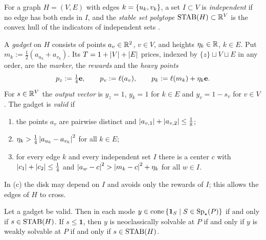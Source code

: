 For a graph $H=(V,E)$ with edges $k=\left\{ u_k,v_k \right\}$, a set $I\subset V$ is \emph{independent} if no edge has both ends in $I$, and the \emph{stable set polytope} $\operatorname{STAB}(H)\subset\mathbb{R}^V$ is the convex hull of the indicators of independent sets \citep[Ch.~9]{GrotschelLovaszSchrijver1988}.

\begin{definition}[gadget]\label{def:gadget}
A \emph{gadget} on $H$ consists of points $a_v\in\mathbb{R}^2$, $v\in V$, and heights $\eta_k\in\mathbb{R}$, $k\in E$. Put $m_k:=\frac12(a_{u_k}+a_{v_k})$. Its $T=1+\left\lvert V \right\rvert+\left\lvert E \right\rvert$ prices, indexed by $\{z\}\sqcup V\sqcup E$ in any order, are the \emph{marker}, the \emph{rewards} and the \emph{heavy points}
\[
p_z:=\tfrac14\mathbf e,\qquad p_v:=\ell(a_v),\qquad p_k:=\ell(m_k)+\eta_k\mathbf e.
\]
For $s\in\mathbb{R}^V$ the \emph{output vector} is $y_z=1$, $y_k=1$ for $k\in E$ and $y_v=1-s_v$ for $v\in V$. The gadget is \emph{valid} if
\begin{enumerate}[label=(\alph*)]
\item the points $a_v$ are pairwise distinct and $\left\lvert a_{v,1} \right\rvert+\left\lvert a_{v,2} \right\rvert\le\frac18$;
\item $\eta_k>\frac14\left\lvert a_{u_k}-a_{v_k} \right\rvert^2$ for all $k\in E$;
\item for every edge $k$ and every independent set $I$ there is a center $c$ with $\left\lvert c_1 \right\rvert+\left\lvert c_2 \right\rvert\le\frac14$ and $\left\lvert a_w-c \right\rvert^2>\left\lvert m_k-c \right\rvert^2+\eta_k$ for all $w\in I$.
\end{enumerate}
\end{definition}

In (c) the disk may depend on $I$ and avoids only the rewards of $I$; this allows the edges of $H$ to cross.

\begin{theorem}[gadget]\label{thm:gadget}
Let a gadget be valid. Then in each mode $y\in\operatorname{cone}\left\{ \mathbf 1_{S}\mid S\in\operatorname{Sp}_\star(P) \right\}$ if and only if $s\in\operatorname{STAB}(H)$. If $s\le\mathbf 1$, then $y$ is neoclassically solvable at $P$ if and only if $y$ is weakly solvable at $P$ if and only if $s\in\operatorname{STAB}(H)$.
\end{theorem}

